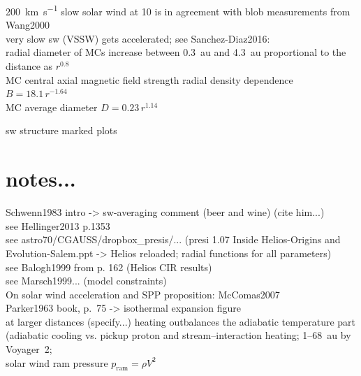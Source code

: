 \SI{200}{\km\per\s} slow solar wind at \SI{10}{\Rs} is in agreement with blob measurements from Wang2000\\

very slow sw (VSSW) gets accelerated; see Sanchez-Diaz2016:\\


radial diameter of MCs increase between 0.3~au and 4.3~au proportional to the distance as $r^{0.8}$ \citep{Bothmer1998}\\
MC central axial magnetic field strength radial density dependence $B = 18.1\,r^{-1.64}$ \citet{Leitner2007}\\
MC average diameter $D = 0.23\,r^{1.14}$ \citet{Leitner2007}

sw structure marked plots\\


\section{notes...}

Schwenn1983 intro -> sw-averaging comment (beer and wine) (cite him...)\\
see Hellinger2013 p.1353\\
see astro70/CGAUSS/dropbox\_presis/... (presi 1.07 Inside Helios-Origins and Evolution-Salem.ppt -> Helios reloaded; radial functions for all parameters)\\
see Balogh1999 from p. 162 (Helios CIR results)\\
see Marsch1999... (model constraints)\\
On solar wind acceleration and SPP proposition: McComas2007\\
Parker1963 book, p.~75 -> isothermal expansion figure\\	%


at larger distances (specify...) heating outbalances the adiabatic temperature part (adiabatic cooling vs. pickup proton and stream--interaction heating; 1--68~au by Voyager~2; \citet{Richardson2003}\\
solar wind ram pressure $p_\text{ram} = \rho V^2$\\


